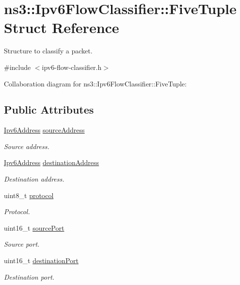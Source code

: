 \hypertarget{structns3_1_1Ipv6FlowClassifier_1_1FiveTuple}{}\section{ns3\+:\+:Ipv6\+Flow\+Classifier\+:\+:Five\+Tuple Struct Reference}
\label{structns3_1_1Ipv6FlowClassifier_1_1FiveTuple}


Structure to classify a packet.  




{\ttfamily \#include $<$ipv6-\/flow-\/classifier.\+h$>$}



Collaboration diagram for ns3\+:\+:Ipv6\+Flow\+Classifier\+:\+:Five\+Tuple\+:
\subsection*{Public Attributes}
\begin{DoxyCompactItemize}
\item 
\hyperlink{classns3_1_1Ipv6Address}{Ipv6\+Address} \hyperlink{structns3_1_1Ipv6FlowClassifier_1_1FiveTuple_ac1f74288fb36b9dfae5b0eaacfa2d4c3}{source\+Address}
\begin{DoxyCompactList}\small\item\em Source address. \end{DoxyCompactList}\item 
\hyperlink{classns3_1_1Ipv6Address}{Ipv6\+Address} \hyperlink{structns3_1_1Ipv6FlowClassifier_1_1FiveTuple_a43435ef032d955ddada2da2171bb13bb}{destination\+Address}
\begin{DoxyCompactList}\small\item\em Destination address. \end{DoxyCompactList}\item 
uint8\+\_\+t \hyperlink{structns3_1_1Ipv6FlowClassifier_1_1FiveTuple_a9e47ac11b908baf101e4ca2d34e10cba}{protocol}
\begin{DoxyCompactList}\small\item\em Protocol. \end{DoxyCompactList}\item 
uint16\+\_\+t \hyperlink{structns3_1_1Ipv6FlowClassifier_1_1FiveTuple_a7be9b9e8a14d35a600c1078b29b89ed6}{source\+Port}
\begin{DoxyCompactList}\small\item\em Source port. \end{DoxyCompactList}\item 
uint16\+\_\+t \hyperlink{structns3_1_1Ipv6FlowClassifier_1_1FiveTuple_a3e148db5b89d2b98e79f7c1bfa62660b}{destination\+Port}
\begin{DoxyCompactList}\small\item\em Destination port. \end{DoxyCompactList}\end{DoxyCompactItemize}


